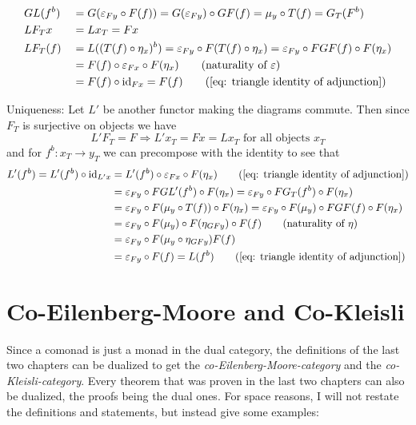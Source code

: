 \begin{beweis}
\begin{itemize1}
\begin{align*}
        &GL(f^b) &&= G(\eps_{Fy} \circ F(f)) = G(\eps_{Fy}) \circ GF(f) = \mu_y \circ T(f) = G_T(F^b) \\
        &LF_Tx &&= Lx_T = Fx \\
        &LF_T(f) &&= L((T(f) \circ \eta_x)^b) 
        = \eps_{Fy} \circ F(T(f) \circ \eta_x) = \eps_{Fy} \circ FGF(f) \circ F(\eta_x) \\
        &&&= F(f) \circ \eps_{Fx} \circ F(\eta_x) \tag{naturality of $\eps$} \\
        &&&= F(f) \circ \id_{Fx} = F(f) \tag{\ref{eq: triangle identity of adjunction}}
    \end{align*}
    \item Uniqueness: Let $L'$ be another functor making the diagrams commute.
    Then since $F_T$ is surjective on objects we have
    \[
        L'F_T = F \Rightarrow L'x_T = Fx = Lx_T \text{ for all objects } x_T
    \]
    and for $f^b \colon x_T \to y_T$ we can precompose with the identity to see that 
    \begin{align*}
        L'(f^b) = L'(f^b) \circ \id_{L'x} &= L'(f^b) \circ \eps_{Fx} \circ F(\eta_x) \tag{\ref{eq: triangle identity of adjunction}} \\
        &= \eps_{Fy} \circ FGL'(f^b) \circ F(\eta_x) 
        = \eps_{Fy} \circ FG_T(f^b) \circ F(\eta_x) \\
        &= \eps_{Fy} \circ F(\mu_y \circ T(f)) \circ F(\eta_x) 
        = \eps_{Fy} \circ F(\mu_y) \circ FGF(f) \circ F(\eta_x) \\
        &= \eps_{Fy} \circ F(\mu_y) \circ F(\eta_{GFy}) \circ F(f) \tag{naturality of $\eta$} \\
        &= \eps_{Fy} \circ F(\mu_y \circ \eta_{GFy}) F(f) \\
        &= \eps_{Fy} \circ F(f) = L(f^b) \tag{\ref{eq: triangle identity of adjunction}}
    \end{align*}  
    \end{itemize1}
\end{beweis}
\section{Co-Eilenberg-Moore and Co-Kleisli}
Since a comonad is just a monad in the dual category, the definitions of the last two chapters can be 
dualized to get the \textit{co-Eilenberg-Moore-category} and the \textit{co-Kleisli-category}.
Every theorem that was proven in the last two chapters can also be dualized, the proofs being the dual ones.
For space reasons, I will not restate the definitions and statements, but instead give some examples: